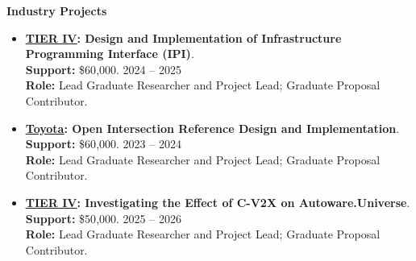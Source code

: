 \documentclass[11pt]{article}
\let\cvplainhref\href
\renewcommand{\href}[2]{\cvplainhref{#1}{\uline{#2}}}
\newcommand{\cvsubsection}[1]{%
  \Needspace{3\baselineskip}%
  \vspace{0.32em}%
  {\bfseries #1}\par
  \vspace{0.12em}
}
\begin{document}
\cvsubsection{Industry Projects}
\begin{itemize}
    \item \textbf{\href{https://tier4.co.jp/en/}{TIER IV}: Design and Implementation of Infrastructure Programming Interface (IPI)}.\\
    \textbf{Support:} \$60{,}000. \hfill 2024 -- 2025\\
    \textbf{Role:} Lead Graduate Researcher and Project Lead; Graduate Proposal Contributor.\\
    \item \textbf{\href{https://pressroom.toyota.com/topic/research-development/}{Toyota}: Open Intersection Reference Design and Implementation}.\\
    \textbf{Support:} \$60{,}000. \hfill 2023 -- 2024\\
    \textbf{Role:} Lead Graduate Researcher and Project Lead; Graduate Proposal Contributor.\\
    \item \textbf{\href{https://tier4.co.jp/en/}{TIER IV}: Investigating the Effect of C-V2X on Autoware.Universe}.\\
    \textbf{Support:} \$50{,}000. \hfill 2025 -- 2026\\
    \textbf{Role:} Lead Graduate Researcher and Project Lead; Graduate Proposal Contributor.\\
\end{itemize}
\end{document}
